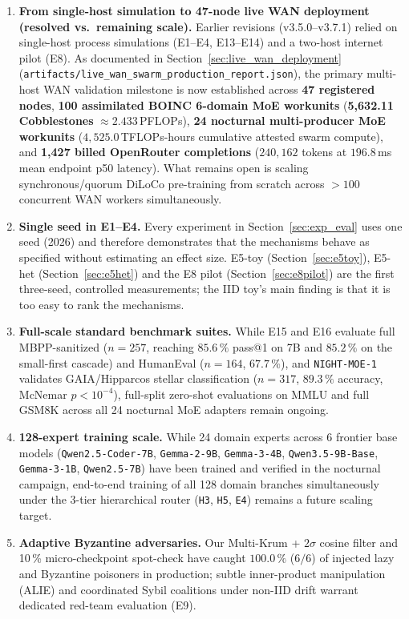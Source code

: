 \documentclass[11pt,a4paper]{article}
\begin{document}
\begin{enumerate}[leftmargin=1.8em]
    \item \textbf{From single-host simulation to 47-node live WAN deployment (resolved vs.\ remaining scale).} Earlier revisions (v3.5.0--v3.7.1) relied on single-host process simulations (E1--E4, E13--E14) and a two-host internet pilot (E8). As documented in Section~\ref{sec:live_wan_deployment} (\texttt{artifacts/live\_wan\_swarm\_production\_report.json}), the primary multi-host WAN validation milestone is now established across \textbf{47 registered nodes}, \textbf{100 assimilated BOINC 6-domain MoE workunits} (\textbf{5{,}632.11 Cobblestones} $\approx 2.433$\,PFLOPs), \textbf{24 nocturnal multi-producer MoE workunits} ($4{,}525.0$\,TFLOPs-hours cumulative attested swarm compute), and \textbf{1{,}427 billed OpenRouter completions} ($240{,}162$ tokens at $196.8$\,ms mean endpoint p50 latency). What remains open is scaling synchronous/quorum DiLoCo pre-training from scratch across $>100$ concurrent WAN workers simultaneously.
    \item \textbf{Single seed in E1--E4.} Every experiment in Section~\ref{sec:exp_eval} uses one seed (2026) and therefore demonstrates that the mechanisms behave as specified without estimating an effect size. E5-toy (Section~\ref{sec:e5toy}), E5-het (Section~\ref{sec:e5het}) and the E8 pilot (Section~\ref{sec:e8pilot}) are the first three-seed, controlled measurements; the IID toy's main finding is that it is too easy to rank the mechanisms.
    \item \textbf{Full-scale standard benchmark suites.} While E15 and E16 evaluate full MBPP-sanitized ($n=257$, reaching $85.6\,\%$ pass@1 on 7B and $85.2\,\%$ on the small-first cascade) and HumanEval ($n=164$, $67.7\,\%$), and \texttt{NIGHT-MOE-1} validates GAIA/Hipparcos stellar classification ($n=317$, $89.3\,\%$ accuracy, McNemar $p < 10^{-4}$), full-split zero-shot evaluations on MMLU and full GSM8K across all 24 nocturnal MoE adapters remain ongoing.
    \item \textbf{128-expert training scale.} While 24 domain experts across 6 frontier base models (\texttt{Qwen2.5-Coder-7B}, \texttt{Gemma-2-9B}, \texttt{Gemma-3-4B}, \texttt{Qwen3.5-9B-Base}, \texttt{Gemma-3-1B}, \texttt{Qwen2.5-7B}) have been trained and verified in the nocturnal campaign, end-to-end training of all 128 domain branches simultaneously under the 3-tier hierarchical router (\texttt{H3}, \texttt{H5}, \texttt{E4}) remains a future scaling target.
    \item \textbf{Adaptive Byzantine adversaries.} Our Multi-Krum + $2\sigma$ cosine filter and 10\,\% micro-checkpoint spot-check have caught $100.0\,\%$ ($6/6$) of injected lazy and Byzantine poisoners in production; subtle inner-product manipulation (ALIE) and coordinated Sybil coalitions under non-IID drift warrant dedicated red-team evaluation (E9).

\end{enumerate}
\end{document}
